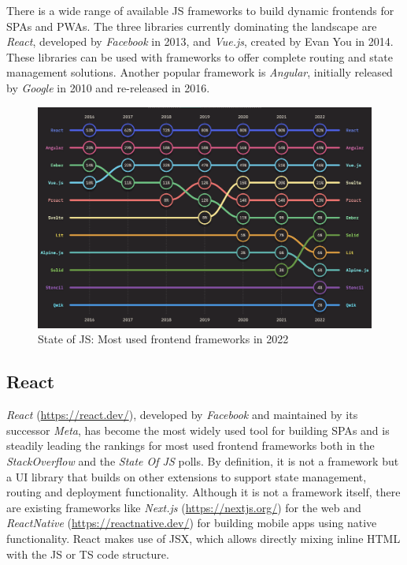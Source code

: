 There is a wide range of available \ac{JS} frameworks to build dynamic frontends for \ac{SPA}s and \ac{PWA}s. The three libraries currently dominating the landscape are \emph{React}, developed by \emph{Facebook} in 2013, and \emph{Vue.js}, created by Evan You in 2014. These libraries can be used with frameworks to offer complete routing and state management solutions. Another popular framework is \emph{Angular}, initially released by \emph{Google} in 2010 and re-released in 2016.

\begin{figure}[h]
    \centering
    \includegraphics[scale=0.4]{04_Artefakte/01_Abbildungen/stateofjs-usage-frontend-frameworks-2022}
    \caption[{Most used frontend frameworks in 2022}]{State of JS: Most used frontend frameworks in 2022\protect\footnotemark}
    \label{fig:mostUsedFrameworks}
\end{figure}

\subsection{React}

\emph{React} (\url{https://react.dev/}), developed by \emph{Facebook} and maintained by its successor \emph{Meta}, has become the most widely used tool for building \ac{SPA}s and is steadily leading the rankings for most used frontend frameworks both in the \emph{StackOverflow} \parencite{stackOverflowPollWebFrameworks23} and the \emph{State Of JS} \parencite{mostUsedFrontendFrameworks22} polls. By definition, it is not a framework but a \ac{UI} library that builds on other extensions to support state management, routing and deployment functionality. Although it is not a framework itself, there are existing frameworks like \emph{Next.js} (\url{https://nextjs.org/}) for the web and \emph{ReactNative} (\url{https://reactnative.dev/}) for building mobile apps using native functionality. React makes use of \ac{JSX}, which allows directly mixing inline \ac{HTML} with the \ac{JS} or \ac{TS} code structure.

